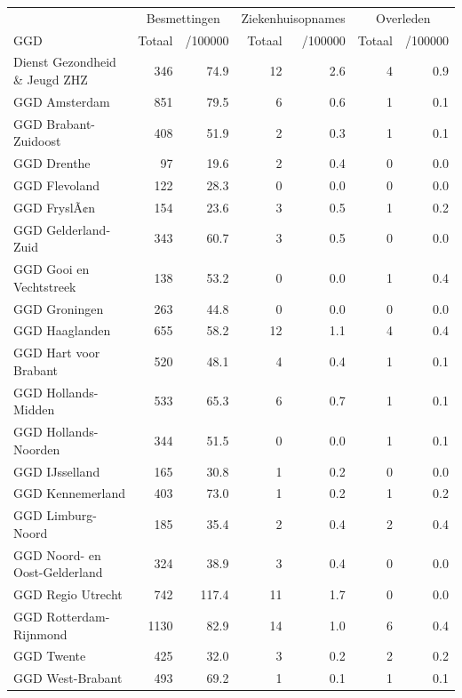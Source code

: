 \documentclass[
  english,
  man,floatsintext]{apa6}
\begin{document}
\begin{table}
\centering\begingroup\fontsize{10}{12}\selectfont

\begin{threeparttable}
\begin{tabular}{lrrrrrr}
\toprule
\multicolumn{1}{c}{ } & \multicolumn{2}{c}{Besmettingen} & \multicolumn{2}{c}{Ziekenhuisopnames} & \multicolumn{2}{c}{Overleden} \\
\cmidrule(l{3pt}r{3pt}){2-3} \cmidrule(l{3pt}r{3pt}){4-5} \cmidrule(l{3pt}r{3pt}){6-7}
GGD & Totaal & /100000 & Totaal & /100000 & Totaal & /100000\\
\midrule
Dienst Gezondheid \& Jeugd ZHZ & 346 & 74.9 & 12 & 2.6 & 4 & 0.9\\
GGD Amsterdam & 851 & 79.5 & 6 & 0.6 & 1 & 0.1\\
GGD Brabant-Zuidoost & 408 & 51.9 & 2 & 0.3 & 1 & 0.1\\
GGD Drenthe & 97 & 19.6 & 2 & 0.4 & 0 & 0.0\\
GGD Flevoland & 122 & 28.3 & 0 & 0.0 & 0 & 0.0\\
GGD FryslÃ¢n & 154 & 23.6 & 3 & 0.5 & 1 & 0.2\\
GGD Gelderland-Zuid & 343 & 60.7 & 3 & 0.5 & 0 & 0.0\\
GGD Gooi en Vechtstreek & 138 & 53.2 & 0 & 0.0 & 1 & 0.4\\
GGD Groningen & 263 & 44.8 & 0 & 0.0 & 0 & 0.0\\
GGD Haaglanden & 655 & 58.2 & 12 & 1.1 & 4 & 0.4\\
GGD Hart voor Brabant & 520 & 48.1 & 4 & 0.4 & 1 & 0.1\\
GGD Hollands-Midden & 533 & 65.3 & 6 & 0.7 & 1 & 0.1\\
GGD Hollands-Noorden & 344 & 51.5 & 0 & 0.0 & 1 & 0.1\\
GGD IJsselland & 165 & 30.8 & 1 & 0.2 & 0 & 0.0\\
GGD Kennemerland & 403 & 73.0 & 1 & 0.2 & 1 & 0.2\\
GGD Limburg-Noord & 185 & 35.4 & 2 & 0.4 & 2 & 0.4\\
GGD Noord- en Oost-Gelderland & 324 & 38.9 & 3 & 0.4 & 0 & 0.0\\
GGD Regio Utrecht & 742 & 117.4 & 11 & 1.7 & 0 & 0.0\\
GGD Rotterdam-Rijnmond & 1130 & 82.9 & 14 & 1.0 & 6 & 0.4\\
GGD Twente & 425 & 32.0 & 3 & 0.2 & 2 & 0.2\\
GGD West-Brabant & 493 & 69.2 & 1 & 0.1 & 1 & 0.1\\

\end{tabular}
\end{threeparttable}
\end{table}
\end{document}
